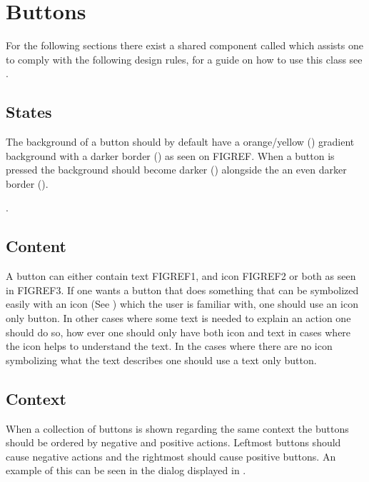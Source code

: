 
\chapter{Buttons}
\label{cha:buttons}

For the following sections there exist a shared component called  which assists one to comply with the following design rules, for a guide on how to use this class see .

\section{States}
\label{sec:button_states}

The background of a button should by default have a orange/yellow () gradient background with a darker border () as seen on FIGREF. When a button is pressed the background should become darker () alongside the an even darker border ().

. 

\section{Content}
\label{sec:button_content}

A button can either contain text FIGREF1, and icon FIGREF2 or both as seen in FIGREF3. If one wants a button that does something that can be symbolized easily with an icon (See ) which the user is familiar with, one should use an icon only button. In other cases where some text is needed to explain an action one should do so, how ever one should only have both icon and text in cases where the icon helps to understand the text. In the cases where there are no icon symbolizing what the text describes one should use a text only button.


\section{Context}
\label{sec:button_context}

When a collection of buttons is shown regarding the same context the buttons should be ordered by negative and positive actions. Leftmost buttons should cause negative actions and the rightmost should cause positive buttons. An example of this can be seen in the dialog displayed in .